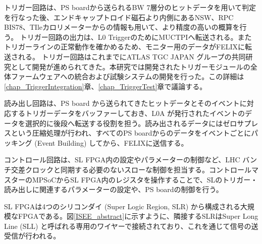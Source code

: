 トリガー回路は、PS boardから送られるBW 7層分のヒットデータを用いて\pt 判定を行なった後、エンドキャップトロイド磁石より内側にあるNSW、RPC BIS78、TIleカロリメーターからの情報も用いて、より精度の高い\pt の概算を行う。
トリガー回路の出力は、L0 TriggerのためにMUCTPIへ転送される。またトリガーラインの正常動作を確かめるため、モニター用のデータがFELIXに転送される。
トリガー回路はこれまでにATLAS TGC JAPAN グループの共同研究として開発が進められてきた。本研究では開発されたトリガーモジュールの全体ファームウェアへの統合および試験システムの開発を行った。この詳細は\ref{chap_TriggerIntegration}章、\ref{chap_TriggerTest}章で議論する。

読み出し回路は、PS board から送られてきたヒットデータとそのイベントに対応するトリガーデータをバッファーしておき、L0A が発行されたイベントのデータを選択的に後段へ転送する役割を担う。読み出されるデータにはゼロサプレスという圧縮処理が行われ、すべてのPS boardからのデータをイベントごとにパッキング  (Event Building) してから、FELIXに送信する。

コントロール回路は、SL FPGA内の設定やパラメーターの制御など、LHC バンチ交差クロックと同期する必要のないスローな制御を担当する。コントロールマスターのMPSoCからSL FPGA内のレジスタを操作することで、SLのトリガー・読み出しに関連するパラメーターの設定や、PS boardの制御を行う。

SL FPGAは4つのシリコンダイ (Super Logic Region, SLR) から構成される大規模なFPGAである。図\ref{ISEE_abstract}に示すように、隣接するSLRはSuper Long Line (SLL) と呼ばれる専用のワイヤーで接続されており、これを通じて信号の送受信が行われる。

